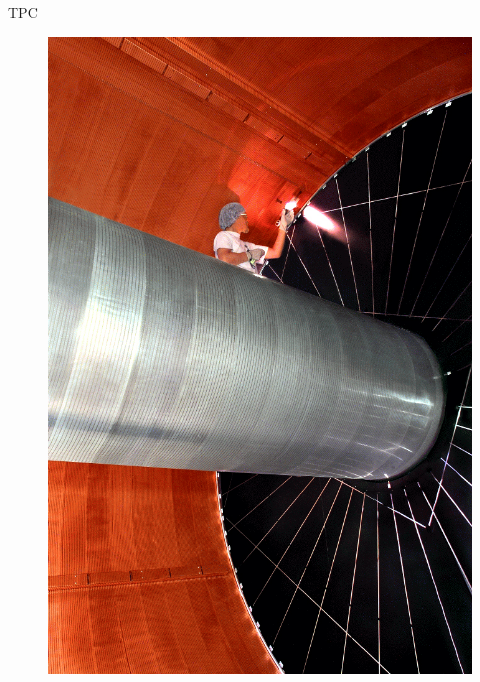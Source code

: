 \documentclass[18pt,notheorems,hyperref={pdfauthor=whatever}]{beamer}
\begin{document}
\begin{frame}{TPC}
   \begin{figure}[h!]
    \centering
    \begin{minipage}{.5\textwidth}
        \centering
        \includegraphics[scale=0.25]{images/TPC_inside.jpg}
    \end{minipage}%
    \begin{minipage}{0.5\textwidth}
        \centering

\end{minipage}
\end{figure}
\end{frame}
\end{document}
